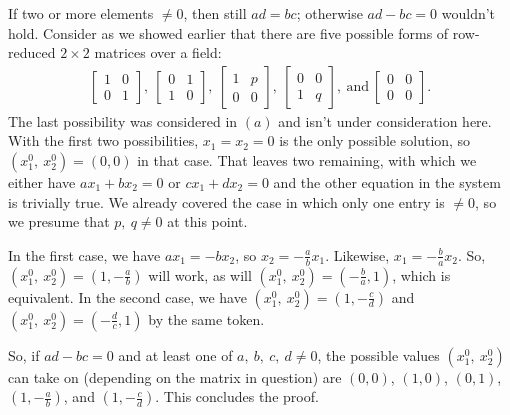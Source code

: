 \documentclass[12pt]{article}
\begin{document}
\begin{enumerate}
\begin{enumerate}
          If two or more elements $\neq 0$, then still $ad = bc$;
          otherwise $ad - bc = 0$ wouldn't hold. Consider as we
          showed earlier that there are five possible forms of
          row-reduced $2 \times 2$ matrices over a field:
          \begin{align*}
            \begin{bmatrix}
               1 & 0\\
               0 & 1
            \end{bmatrix},\ 
            \begin{bmatrix}
               0 & 1\\
               1 & 0
            \end{bmatrix},\ 
            \begin{bmatrix}
               1 & p\\
               0 & 0
            \end{bmatrix},\ 
            \begin{bmatrix}
               0 & 0\\
               1 & q
            \end{bmatrix},\ \text{and}\ 
            \begin{bmatrix}
               0 & 0\\
               0 & 0
            \end{bmatrix}.
          \end{align*}
          The last possibility was considered in $(a)$ and isn't
          under consideration here. With the first two
          possibilities, $x_1 = x_2 = 0$ is the only possible
          solution, so $(x_{1}^{0},\ x_{2}^{0}) = (0,0)$ in that
          case. That leaves two remaining, with which we either
          have $ax_1 + bx_2 = 0$ or $cx_1 + dx_2 = 0$ and the
          other equation in the system is trivially true. We
          already covered the case in which only one entry is
          $\neq 0$, so we presume that $p,\ q \neq 0$ at this
          point.

          In the first case, we have $ax_1 = -bx_2$, so $x_2 =
          -\frac{a}{b}x_1$. Likewise, $x_1 = -\frac{b}{a}x_2$.
          So, $(x_{1}^{0},\ x_{2}^{0}) = (1,-\frac{a}{b})$ will
          work, as will $(x_{1}^{0},\ x_{2}^{0}) =
          (-\frac{b}{a},1)$, which is equivalent. In the second
          case, we have $(x_{1}^{0},\ x_{2}^{0}) =
          (1,-\frac{c}{d})$ and $(x_{1}^{0},\ x_{2}^{0}) =
          (-\frac{d}{c},1)$ by the same token.

          So, if $ad - bc = 0$ and at least one of $a,\ b,\ c,\ d
          \neq 0$, the possible values $(x_{1}^{0},\ x_{2}^{0})$
          can take on (depending on the matrix in question) are
          $(0,0)$, $(1,0)$, $(0,1)$, $(1,-\frac{a}{b})$, and
          $(1,-\frac{c}{d})$. This concludes the proof.

    \end{enumerate}


\end{enumerate}
\end{document}
